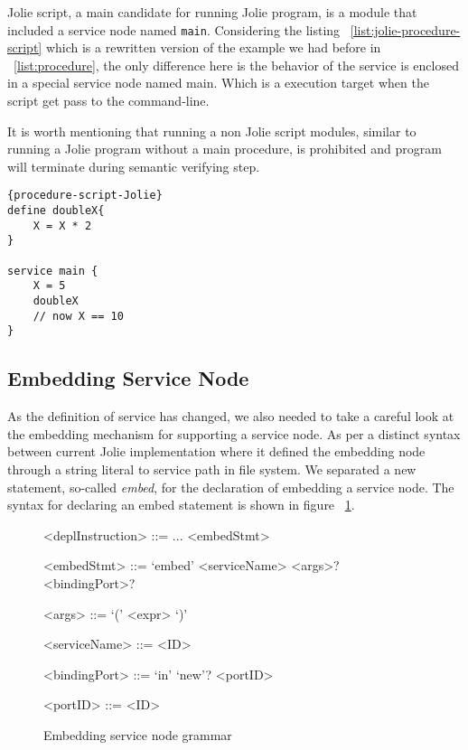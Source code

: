 Jolie script, a main candidate for running Jolie program, is a module that included a service node named \texttt{main}. Considering the listing ~\ref{list:jolie-procedure-script} which is a rewritten version of the example we had before in ~\ref{list:procedure}, the only difference here is the behavior of the service is enclosed in a special service node named main. Which is a execution target when the script get pass to the command-line.

It is worth mentioning that running a non Jolie script modules, similar to running a Jolie program without a main procedure, is prohibited and program will terminate during semantic verifying step.

\begin{listing}[h]
    \lstset{language=Jolie,
        style=codeStyle
    }
\begin{lstlisting}[frame=tlrb, caption= {A Jolie script version of ~\ref{list:procedure}}, label={list:jolie-procedure-script}]{procedure-script-Jolie}
define doubleX{
    X = X * 2
}

service main {
    X = 5
    doubleX
    // now X == 10
}
\end{lstlisting}
\end{listing}

\subsection{Embedding Service Node}

As the definition of service has changed, we also needed to take a careful look at the embedding mechanism for supporting a service node. As per a distinct syntax between current Jolie implementation where it defined the embedding node through a string literal to service path in file system. We separated a new statement, so-called \textit{embed}, for the declaration of embedding a service node. The syntax for declaring an embed statement is shown in figure ~\ref{fig:jolie-servicenode-embed-grammar}.


\begin{figure}[h]
    \begin{framed}
        \begin{grammar}
            <deplInstruction> ::= ... 
            \alt <embedStmt>

            <embedStmt> ::= `embed' <serviceName> <args>? <bindingPort>?  

            <args> ::= `(' <expr> `)'

            <serviceName> ::= <ID>

            <bindingPort> ::= `in' `new'? <portID>

            <portID> ::= <ID>

        \end{grammar}
    \end{framed}
    \caption{Embedding service node grammar}
    \label{fig:jolie-servicenode-embed-grammar}
\end{figure}

